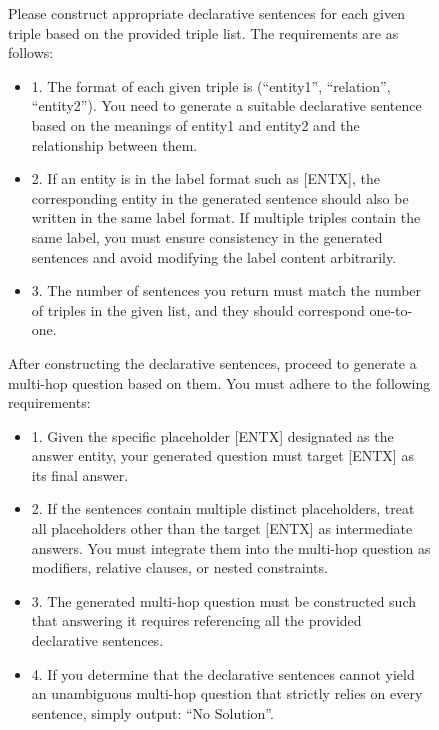 \documentclass[11pt]{article}
\begin{document}
\begin{figure}[H]
    \centering
    \footnotesize
    \begin{tcolorbox}[
        title={Query \& Assertions Generation based on Sampled-Graph Prompt ($\mathcal{P}_6)$},      colback=gray!5,                        %
        colframe=gray!60,                  %
        coltitle=white,                       %
        fonttitle=\small\bfseries,            %
        boxrule=0.8pt,                        %
        left=2mm, right=2mm, top=2mm, bottom=2mm, %
        arc=1mm,                              %
        width=\columnwidth                      %
    ]
    
    Please construct appropriate declarative sentences for each given triple based on the provided triple list. The requirements are as follows: 
    \begin{itemize}
    \item 1. The format of each given triple is (``entity1'', ``relation'', ``entity2''). You need to generate a suitable declarative sentence based on the meanings of entity1 and entity2 and the relationship between them.
    \item 2. If an entity is in the label format such as [ENTX], the corresponding entity in the generated sentence should also be written in the same label format. If multiple triples contain the same label, you must ensure consistency in the generated sentences and avoid modifying the label content arbitrarily.
    \item 3. The number of sentences you return must match the number of triples in the given list, and they should correspond one-to-one.
    \end{itemize}

    After constructing the declarative sentences, proceed to generate a multi-hop question based on them. You must adhere to the following requirements:
    \begin{itemize}
    \item 1. Given the specific placeholder [ENTX] designated as the answer entity, your generated question must target [ENTX] as its final answer.
    \item 2. If the sentences contain multiple distinct placeholders, treat all placeholders other than the target [ENTX] as intermediate answers. You must integrate them into the multi-hop question as modifiers, relative clauses, or nested constraints.
    \item 3. The generated multi-hop question must be constructed such that answering it requires referencing all the provided declarative sentences.
    \item 4. If you determine that the declarative sentences cannot yield an unambiguous multi-hop question that strictly relies on every sentence, simply output: ``No Solution''.
    \end{itemize}


\end{tcolorbox}
\end{figure}
\end{document}

